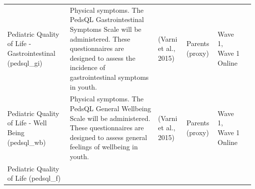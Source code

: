 \documentclass[
]{book}
\begin{document}
\begin{longtable}[]{@{}llllll@{}}
\begin{minipage}[t]{0.18\columnwidth}
Pediatric Quality of Life - Gastrointestinal (pedsql\_gi)\strut
\end{minipage} & \begin{minipage}[t]{0.18\columnwidth}\raggedright
Physical symptoms. The PedsQL Gastrointestinal Symptoms Scale will be administered. These questionnaires are designed to assess the incidence of gastrointestinal symptoms in youth.\strut
\end{minipage} & \begin{minipage}[t]{0.15\columnwidth}\raggedright
(Varni et al., 2015)\strut
\end{minipage} & \begin{minipage}[t]{0.16\columnwidth}\raggedright
Parents (proxy)\strut
\end{minipage} & \begin{minipage}[t]{0.06\columnwidth}\raggedright
Wave 1, Wave 1 Online\strut
\end{minipage} & \begin{minipage}[t]{0.10\columnwidth}\raggedright
\strut
\end{minipage}\tabularnewline
\begin{minipage}[t]{0.18\columnwidth}\raggedright
Pediatric Quality of Life - Well Being (pedsql\_wb)\strut
\end{minipage} & \begin{minipage}[t]{0.18\columnwidth}\raggedright
Physical symptoms. The PedsQL General Wellbeing Scale will be administered. These questionnaires are designed to assess general feelings of wellbeing in youth.\strut
\end{minipage} & \begin{minipage}[t]{0.15\columnwidth}\raggedright
(Varni et al., 2015)\strut
\end{minipage} & \begin{minipage}[t]{0.16\columnwidth}\raggedright
Parents (proxy)\strut
\end{minipage} & \begin{minipage}[t]{0.06\columnwidth}\raggedright
Wave 1, Wave 1 Online\strut
\end{minipage} & \begin{minipage}[t]{0.10\columnwidth}\raggedright
\strut
\end{minipage}\tabularnewline
\begin{minipage}[t]{0.18\columnwidth}\raggedright
Pediatric Quality of Life (pedsql\_f)\strut
\end{minipage} & \begin{minipage}[t]{0.18\columnwidth}\raggedright

\end{minipage}
\end{longtable}
\end{document}
